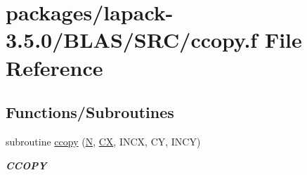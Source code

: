 \hypertarget{lapack-3_85_80_2BLAS_2SRC_2ccopy_8f}{}\section{packages/lapack-\/3.5.0/\+B\+L\+A\+S/\+S\+R\+C/ccopy.f File Reference}
\label{lapack-3_85_80_2BLAS_2SRC_2ccopy_8f}
\subsection*{Functions/\+Subroutines}
\begin{DoxyCompactItemize}
\item 
subroutine \hyperlink{group__complex__blas__level1_ga6113a670d3df40b1b081af52af8c29e1}{ccopy} (\hyperlink{polmisc_8c_a0240ac851181b84ac374872dc5434ee4}{N}, \hyperlink{scsum1_8c_a5a76da95c549c41790389a76e12fdcb5}{C\+X}, I\+N\+C\+X, C\+Y, I\+N\+C\+Y)
\begin{DoxyCompactList}\small\item\em {\bfseries C\+C\+O\+P\+Y} \end{DoxyCompactList}\end{DoxyCompactItemize}
